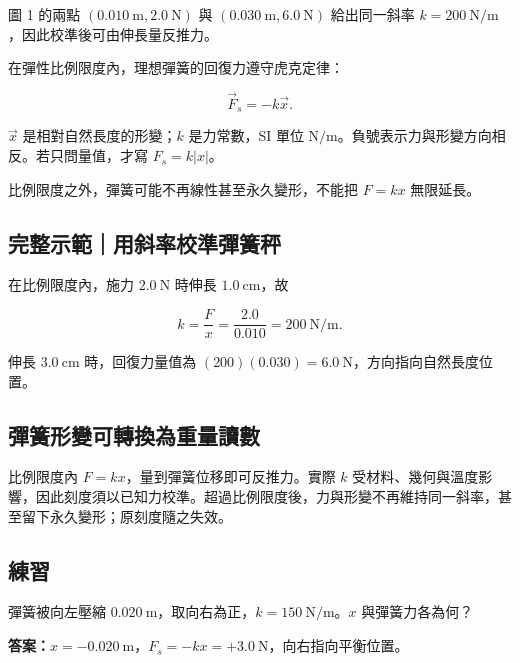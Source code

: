\documentclass[11pt,a4paper]{article}
\begin{document}
圖 1 的兩點 \((0.010\ \mathrm m,2.0\ \mathrm N)\) 與 \((0.030\ \mathrm m,6.0\ \mathrm N)\) 給出同一斜率 \(k=200\ \mathrm{N/m}\)，因此校準後可由伸長量反推力。

在彈性比例限度內，理想彈簧的回復力遵守虎克定律：

\[
\boxed{\vec F_s=-k\vec x}.
\]

\(\vec x\) 是相對自然長度的形變；\(k\) 是力常數，SI 單位 \(\mathrm{N/m}\)。負號表示力與形變方向相反。若只問量值，才寫 \(F_s=k|x|\)。

比例限度之外，彈簧可能不再線性甚至永久變形，不能把 \(F=kx\) 無限延長。

\begin{HandoutWorkedExample}

\subsection{完整示範｜用斜率校準彈簧秤}\label{ux5b8cux6574ux793aux7bc4ux7528ux659cux7387ux6821ux6e96ux5f48ux7c27ux79e4}

在比例限度內，施力 \(2.0\ \mathrm N\) 時伸長 \(1.0\ \mathrm{cm}\)，故

\[
k=\frac{F}{x}=\frac{2.0}{0.010}=200\ \mathrm{N/m}.
\]

伸長 \(3.0\ \mathrm{cm}\) 時，回復力量值為 \((200)(0.030)=6.0\ \mathrm N\)，方向指向自然長度位置。

\end{HandoutWorkedExample}

\subsection{彈簧形變可轉換為重量讀數}\label{ux5f48ux7c27ux5f62ux8b8aux53efux8f49ux63dbux70baux91cdux91cfux8b80ux6578}

比例限度內 \(F=kx\)，量到彈簧位移即可反推力。實際 \(k\) 受材料、幾何與溫度影響，因此刻度須以已知力校準。超過比例限度後，力與形變不再維持同一斜率，甚至留下永久變形；原刻度隨之失效。

\begin{HandoutSelfCheck}

\subsection{練習}\label{ux7df4ux7fd2-1}

彈簧被向左壓縮 \(0.020\ \mathrm m\)，取向右為正，\(k=150\ \mathrm{N/m}\)。\(x\) 與彈簧力各為何？

\textbf{答案：}\(x=-0.020\ \mathrm m\)，\(F_s=-kx=+3.0\ \mathrm N\)，向右指向平衡位置。

\end{HandoutSelfCheck}
\end{document}
